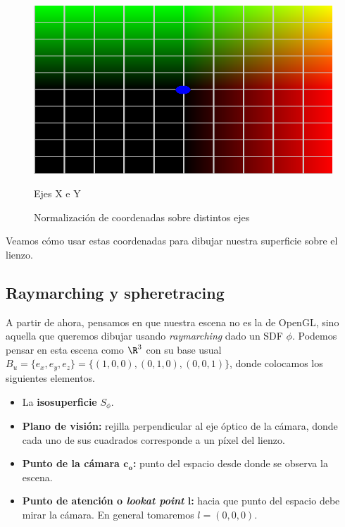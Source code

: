 \begin{figure}[htbp]
    \medskip
    
    \begin{minipage}[b]{0.45\textwidth}
        \centering
        \includegraphics[width=\textwidth]{Plantilla-TFG-master/img/normXY.png}
        \caption{Ejes X e Y}
    \end{minipage}
    
    \caption{Normalización de coordenadas sobre distintos ejes}
    \label{fig:uv}
\end{figure}

Veamos  cómo usar estas coordenadas para dibujar nuestra superficie sobre el lienzo.

\subsection{Raymarching y spheretracing}\label{sec:tracing}
A partir de ahora, pensamos en que nuestra escena no es la de OpenGL, sino aquella que queremos dibujar usando \textit{raymarching} dado un SDF $\phi$. Podemos pensar en esta escena como $\R^3$ con su base usual $B_u = \{e_x,e_y,e_z\} = \{(1,0,0),(0,1,0),(0,0,1)\}$, donde colocamos los siguientes elementos.
\begin{itemize}
    \item La \textbf{isosuperficie} $S_{\phi}$.
    \item \textbf{Plano de visión:} rejilla perpendicular al eje óptico de la cámara, donde cada uno de sus cuadrados corresponde a un píxel del lienzo.
    \item \textbf{Punto de la cámara $\boldsymbol{c_o}$:} punto del espacio desde donde se observa la escena.
    \item \textbf{Punto de atención o \textit{lookat point} $\boldsymbol{l}$:} hacia que punto del espacio debe mirar la cámara. En general tomaremos $l=(0,0,0)$.
\end{itemize}

